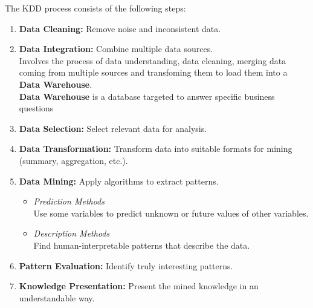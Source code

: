 The KDD process consists of the following steps:
\begin{enumerate}
      \item \textbf{Data Cleaning:} Remove noise and inconsistent data.
      \item \textbf{Data Integration:} Combine multiple data sources.\\
      Involves the process of data understanding, data cleaning, merging data coming from multiple sources and transfoming them to load them into a \textbf{Data Warehouse}.\\
      \textbf{Data Warehouse} is a database targeted to answer specific business questions
      \item \textbf{Data Selection:} Select relevant data for analysis.
      \item \textbf{Data Transformation:} Transform data into suitable formats for mining (summary, aggregation, etc.).
      \item \textbf{Data Mining:} Apply algorithms to extract patterns.
      \begin{itemize}
         \item \textit{Prediction Methods}\\
          Use some variables to predict unknown or future values of other variables.
         \item \textit{Description Methods}\\
          Find human-interpretable patterns that describe the data.
      \end{itemize}
      \item \textbf{Pattern Evaluation:} Identify truly interesting patterns.
      \item \textbf{Knowledge Presentation:} Present the mined knowledge in an understandable way.
\end{enumerate}

